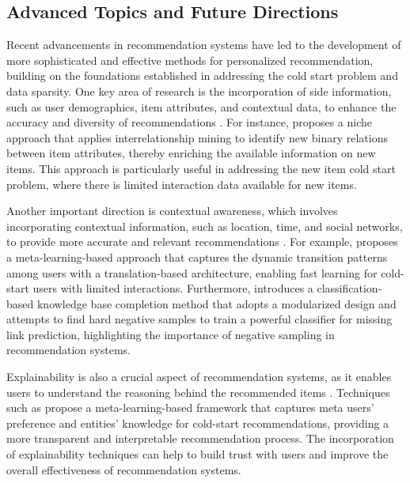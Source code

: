 \documentclass[11pt,a4paper]{article}
\begin{document}
\subsection{Advanced Topics and Future Directions}


Recent advancements in recommendation systems have led to the development of more sophisticated and effective methods for personalized recommendation, building on the foundations established in addressing the cold start problem and data sparsity. One key area of research is the incorporation of side information, such as user demographics, item attributes, and contextual data, to enhance the accuracy and diversity of recommendations \cite{doi:10.1109/icdar.2017.287}. For instance, \cite{doi:10.3390/app9091894} proposes a niche approach that applies interrelationship mining to identify new binary relations between item attributes, thereby enriching the available information on new items. This approach is particularly useful in addressing the new item cold start problem, where there is limited interaction data available for new items.

Another important direction is contextual awareness, which involves incorporating contextual information, such as location, time, and social networks, to provide more accurate and relevant recommendations \cite{doi:10.1609/aaai.v35i5.16601}. For example, \cite{doi:10.1145/3404835.3463089} proposes a meta-learning-based approach that captures the dynamic transition patterns among users with a translation-based architecture, enabling fast learning for cold-start users with limited interactions. Furthermore, \cite{doi:10.1016/j.patrec.2022.04.001} introduces a classification-based knowledge base completion method that adopts a modularized design and attempts to find hard negative samples to train a powerful classifier for missing link prediction, highlighting the importance of negative sampling in recommendation systems.

Explainability is also a crucial aspect of recommendation systems, as it enables users to understand the reasoning behind the recommended items \cite{doi:10.18653/v1/2023.findings-acl.362}. Techniques such as \cite{doi:10.1109/tkde.2022.3168775} propose a meta-learning-based framework that captures meta users' preference and entities' knowledge for cold-start recommendations, providing a more transparent and interpretable recommendation process. The incorporation of explainability techniques can help to build trust with users and improve the overall effectiveness of recommendation systems.
\end{document}
